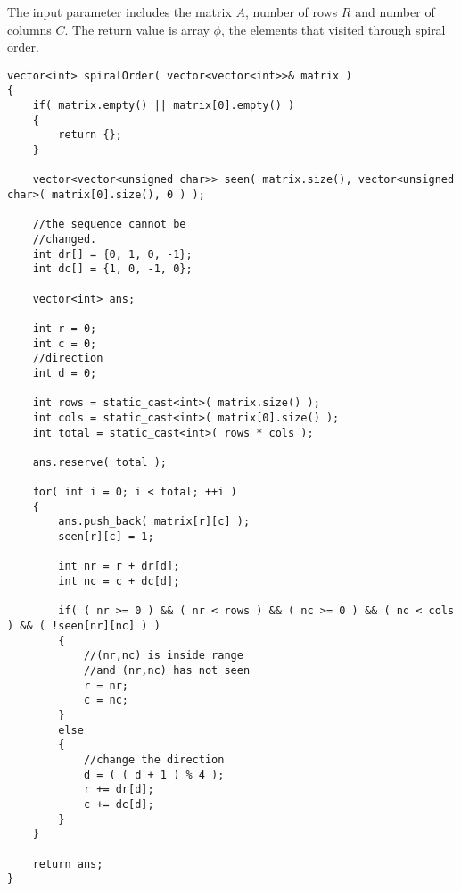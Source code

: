 The input parameter includes the matrix $A$, number of rows $R$ and number of columns $C$. The return value is array $\phi$, the elements that visited through spiral order.


\setcounter{lstlisting}{0}
\begin{lstlisting}[style=customc, caption={Simulation}]
vector<int> spiralOrder( vector<vector<int>>& matrix )
{
    if( matrix.empty() || matrix[0].empty() )
    {
        return {};
    }

    vector<vector<unsigned char>> seen( matrix.size(), vector<unsigned char>( matrix[0].size(), 0 ) );

    //the sequence cannot be
    //changed.
    int dr[] = {0, 1, 0, -1};
    int dc[] = {1, 0, -1, 0};

    vector<int> ans;

    int r = 0;
    int c = 0;
    //direction
    int d = 0;

    int rows = static_cast<int>( matrix.size() );
    int cols = static_cast<int>( matrix[0].size() );
    int total = static_cast<int>( rows * cols );

    ans.reserve( total );

    for( int i = 0; i < total; ++i )
    {
        ans.push_back( matrix[r][c] );
        seen[r][c] = 1;

        int nr = r + dr[d];
        int nc = c + dc[d];

        if( ( nr >= 0 ) && ( nr < rows ) && ( nc >= 0 ) && ( nc < cols ) && ( !seen[nr][nc] ) )
        {
            //(nr,nc) is inside range
            //and (nr,nc) has not seen
            r = nr;
            c = nc;
        }
        else
        {
            //change the direction
            d = ( ( d + 1 ) % 4 );
            r += dr[d];
            c += dc[d];
        }
    }

    return ans;
}
\end{lstlisting}
